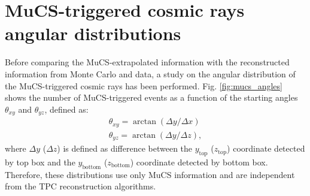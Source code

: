 \documentclass[a4paper]{scrartcl}
\begin{document}
\section{MuCS-triggered cosmic rays angular distributions}\label{sec:flux}
Before comparing the MuCS-extrapolated information with the reconstructed information from Monte Carlo and data, a study on the angular distribution of the MuCS-triggered cosmic rays has been performed.
Fig. \ref{fig:mucs_angles} shows the number of MuCS-triggered events as a function of the starting angles $\theta_{xy}$ and $\theta_{yz}$, defined as:
\begin{equation}
\begin{aligned}
\theta_{xy} = \arctan(\Delta y/\Delta x)\\
\theta_{yz} = \arctan(\Delta y/\Delta z),
\label{eq:angles}
\end{aligned}
\end{equation}
where $\Delta y$ ($\Delta z$) is defined as difference between the $y_{\mathrm{top}}$ ($z_{\mathrm{top}}$) coordinate detected by top box and the $y_{\mathrm{bottom}}$ ($z_{\mathrm{bottom}}$) coordinate detected by bottom box. Therefore, these distributions use only MuCS information and are independent from the TPC reconstruction algorithms.
\end{document}
